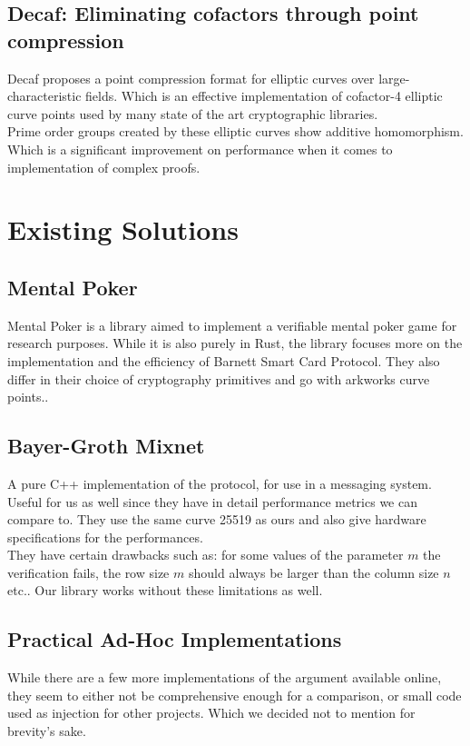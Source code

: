 \documentclass[12pt,a4paper]{report}
\begin{document}
\subsection{Decaf: Eliminating cofactors through point compression}
Decaf\cite{decaf} proposes a point compression format for elliptic curves over 
large-characteristic fields. Which is an effective implementation of cofactor-4 elliptic curve points
used by many state of the art cryptographic libraries.\\
Prime order groups created by these elliptic curves show additive homomorphism. Which is a significant
improvement on performance when it comes to implementation of complex proofs.

\section{Existing Solutions}
\subsection{Mental Poker}
Mental Poker\cite{mentalpoker} is a library aimed to implement a verifiable
mental poker game for research purposes. While it is also purely in Rust,
the library focuses more on the implementation and the efficiency of 
Barnett Smart Card Protocol\cite{Barnett}. They also differ in their choice
of cryptography primitives and go with arkworks curve points.\cite{arkworks}. 

\subsection{Bayer-Groth Mixnet}
A pure C++ implementation\cite{bgmixnet} of the protocol, for use in a messaging system.
Useful for us as well since they have in detail performance metrics we can
compare to. They use the same curve 25519 as ours and also give hardware specifications for the performances.\\
They have certain drawbacks such as: for some values of the parameter $m$ the 
verification fails, the row size $m$ should always be larger than the column size $n$ etc.. 
Our library works without these limitations as well.

\subsection{Practical Ad-Hoc Implementations}
While there are a few more implementations of the argument available online, 
they seem to either not be comprehensive enough for a comparison,
or small code used as injection for other projects. Which we decided not to
mention for brevity's sake.
\end{document}
